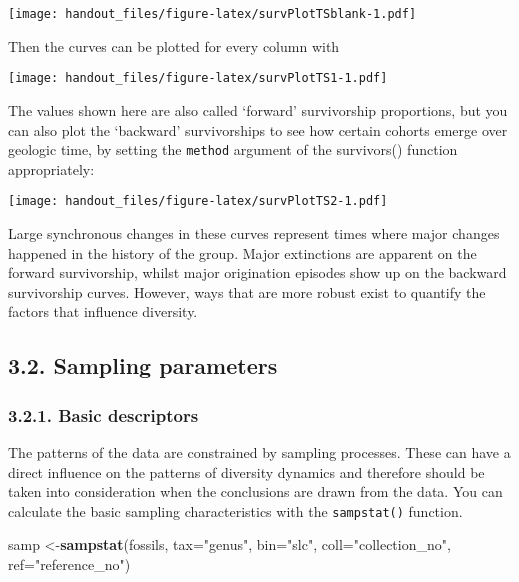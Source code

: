 \documentclass[]{article}
\newenvironment{Shaded}{\begin{snugshade}}{\end{snugshade}}
\newcommand{\CommentTok}[1]{\textcolor[rgb]{0.56,0.35,0.01}{\textit{#1}}}
\newcommand{\ControlFlowTok}[1]{\textcolor[rgb]{0.13,0.29,0.53}{\textbf{#1}}}
\newcommand{\DataTypeTok}[1]{\textcolor[rgb]{0.13,0.29,0.53}{#1}}
\newcommand{\DecValTok}[1]{\textcolor[rgb]{0.00,0.00,0.81}{#1}}
\newcommand{\KeywordTok}[1]{\textcolor[rgb]{0.13,0.29,0.53}{\textbf{#1}}}
\newcommand{\NormalTok}[1]{#1}
\newcommand{\OperatorTok}[1]{\textcolor[rgb]{0.81,0.36,0.00}{\textbf{#1}}}
\newcommand{\StringTok}[1]{\textcolor[rgb]{0.31,0.60,0.02}{#1}}
\begin{document}
\texttt{[image: handout\_files/figure-latex/survPlotTSblank-1.pdf]}

Then the curves can be plotted for every column with

\begin{Shaded}
\end{Shaded}

\texttt{[image: handout\_files/figure-latex/survPlotTS1-1.pdf]}

The values shown here are also called `forward' survivorship
proportions, but you can also plot the `backward' survivorships to see
how certain cohorts emerge over geologic time, by setting the
\texttt{method} argument of the survivors() function appropriately:

\texttt{[image: handout\_files/figure-latex/survPlotTS2-1.pdf]}

Large synchronous changes in these curves represent times where major
changes happened in the history of the group. Major extinctions are
apparent on the forward survivorship, whilst major origination episodes
show up on the backward survivorship curves. However, ways that are more
robust exist to quantify the factors that influence diversity.

\hypertarget{sampling-parameters}{%
\subsection{3.2. Sampling parameters}\label{sampling-parameters}}

\hypertarget{basic-descriptors}{%
\subsubsection{3.2.1. Basic descriptors}\label{basic-descriptors}}

The patterns of the data are constrained by sampling processes. These
can have a direct influence on the patterns of diversity dynamics and
therefore should be taken into consideration when the conclusions are
drawn from the data. You can calculate the basic sampling
characteristics with the \texttt{sampstat()} function.

\begin{Shaded}
\begin{Highlighting}[]
\NormalTok{samp <-}\KeywordTok{sampstat}\NormalTok{(fossils, }\DataTypeTok{tax=}\StringTok{"genus"}\NormalTok{, }\DataTypeTok{bin=}\StringTok{"slc"}\NormalTok{, }
  \DataTypeTok{coll=}\StringTok{"collection_no"}\NormalTok{, }\DataTypeTok{ref=}\StringTok{"reference_no"}\NormalTok{)}
\end{Highlighting}
\end{Shaded}
\end{document}
